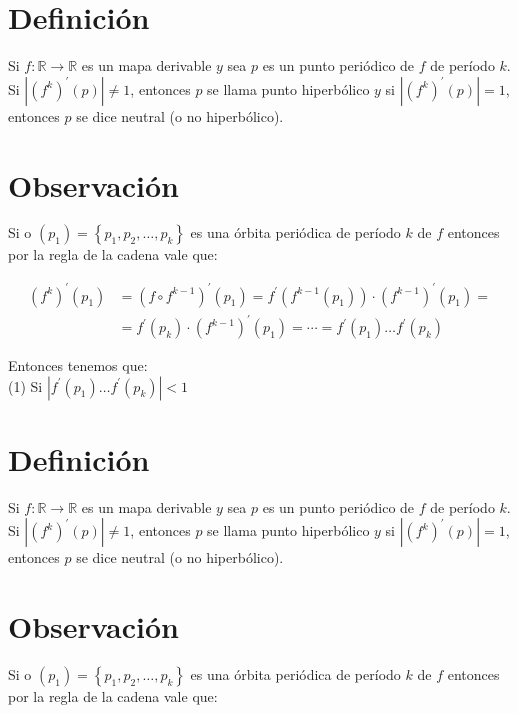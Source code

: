 \documentclass[11pt]{beamer}
\begin{document}
\section*{Definición}
Si $f: \mathbb{R} \rightarrow \mathbb{R}$ es un mapa derivable $y$ sea $p$ es un punto periódico de $f$ de período $k$. Si $\left|\left(f^{k}\right)^{\prime}(p)\right| \neq 1$, entonces $p$ se llama punto hiperbólico $y$ si $\left|\left(f^{k}\right)^{\prime}(p)\right|=1$, entonces $p$ se dice neutral (o no hiperbólico).

\section*{Observación}
Si o $\left(p_{1}\right)=\left\{p_{1}, p_{2}, \ldots, p_{k}\right\}$ es una órbita periódica de período $k$ de $f$ entonces por la regla de la cadena vale que:


\begin{align*}
\left(f^{k}\right)^{\prime}\left(p_{1}\right) & =\left(f \circ f^{k-1}\right)^{\prime}\left(p_{1}\right)=f^{\prime}\left(f^{k-1}\left(p_{1}\right)\right) \cdot\left(f^{k-1}\right)^{\prime}\left(p_{1}\right)=  \tag{1}\\
& =f^{\prime}\left(p_{k}\right) \cdot\left(f^{k-1}\right)^{\prime}\left(p_{1}\right)=\cdots=f^{\prime}\left(p_{1}\right) \ldots f^{\prime}\left(p_{k}\right) \tag{2}
\end{align*}


Entonces tenemos que:\\
(1) Si $\left|f^{\prime}\left(p_{1}\right) \ldots f^{\prime}\left(p_{k}\right)\right|<1$

\section*{Definición}
Si $f: \mathbb{R} \rightarrow \mathbb{R}$ es un mapa derivable $y$ sea $p$ es un punto periódico de $f$ de período $k$. Si $\left|\left(f^{k}\right)^{\prime}(p)\right| \neq 1$, entonces $p$ se llama punto hiperbólico $y$ si $\left|\left(f^{k}\right)^{\prime}(p)\right|=1$, entonces $p$ se dice neutral (o no hiperbólico).

\section*{Observación}
Si o $\left(p_{1}\right)=\left\{p_{1}, p_{2}, \ldots, p_{k}\right\}$ es una órbita periódica de período $k$ de $f$ entonces por la regla de la cadena vale que:
\end{document}
